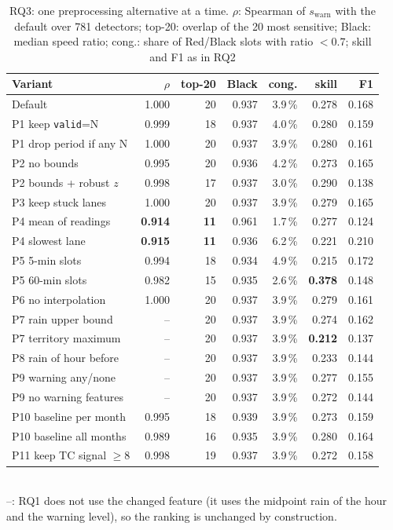 \documentclass[conference]{IEEEtran}
\begin{document}
\begin{table}[t]
\centering
\caption{RQ3: one preprocessing alternative at a time. $\rho$: Spearman of $s_{\mathrm{warn}}$
with the default over 781 detectors; top-20: overlap of the 20 most sensitive; Black: median
speed ratio; cong.: share of Red/Black slots with ratio $<0.7$; skill and F1 as in RQ2}
\label{tab:rq3}
\footnotesize
\setlength{\tabcolsep}{3pt}
\begin{tabular}{@{}lrrrrrr@{}}
\toprule
Variant & $\rho$ & top-20 & Black & cong. & skill & F1 \\
\midrule
Default & 1.000 & 20 & 0.937 & 3.9\,\% & 0.278 & 0.168 \\
P1 keep \texttt{valid}=N & 0.999 & 18 & 0.937 & 4.0\,\% & 0.280 & 0.159 \\
P1 drop period if any N & 1.000 & 20 & 0.937 & 3.9\,\% & 0.280 & 0.161 \\
P2 no bounds & 0.995 & 20 & 0.936 & 4.2\,\% & 0.273 & 0.165 \\
P2 bounds + robust $z$ & 0.998 & 17 & 0.937 & 3.0\,\% & 0.290 & 0.138 \\
P3 keep stuck lanes & 1.000 & 20 & 0.937 & 3.9\,\% & 0.279 & 0.165 \\
P4 mean of readings & \textbf{0.914} & \textbf{11} & 0.961 & 1.7\,\% & 0.277 & 0.124 \\
P4 slowest lane & \textbf{0.915} & \textbf{11} & 0.936 & 6.2\,\% & 0.221 & 0.210 \\
P5 5-min slots & 0.994 & 18 & 0.934 & 4.9\,\% & 0.215 & 0.172 \\
P5 60-min slots & 0.982 & 15 & 0.935 & 2.6\,\% & \textbf{0.378} & 0.148 \\
P6 no interpolation & 1.000 & 20 & 0.937 & 3.9\,\% & 0.279 & 0.161 \\
P7 rain upper bound & -- & 20 & 0.937 & 3.9\,\% & 0.274 & 0.162 \\
P7 territory maximum & -- & 20 & 0.937 & 3.9\,\% & \textbf{0.212} & 0.137 \\
P8 rain of hour before & -- & 20 & 0.937 & 3.9\,\% & 0.233 & 0.144 \\
P9 warning any/none & -- & 20 & 0.937 & 3.9\,\% & 0.277 & 0.155 \\
P9 no warning features & -- & 20 & 0.937 & 3.9\,\% & 0.272 & 0.144 \\
P10 baseline per month & 0.995 & 18 & 0.939 & 3.9\,\% & 0.273 & 0.159 \\
P10 baseline all months & 0.989 & 16 & 0.935 & 3.9\,\% & 0.280 & 0.164 \\
P11 keep TC signal $\geq 8$ & 0.998 & 19 & 0.937 & 3.9\,\% & 0.272 & 0.158 \\
\bottomrule
\end{tabular}
\\[2pt]
{\scriptsize --: RQ1 does not use the changed feature (it uses the midpoint rain of the hour
and the warning level), so the ranking is unchanged by construction.}
\end{table}
\end{document}
